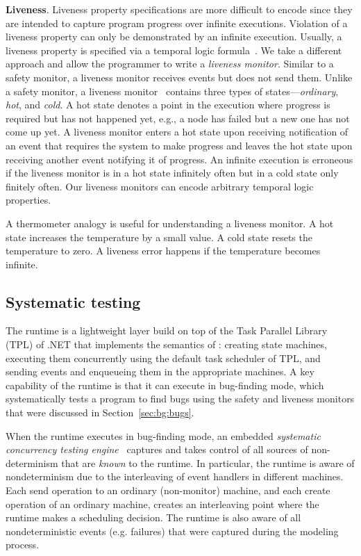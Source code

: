 \textbf{Liveness}.
Liveness property specifications are more difficult to encode since they are intended to capture program progress
over infinite executions.
Violation of a liveness property can only be demonstrated by an infinite execution.
Usually, a liveness property is specified via a temporal logic formula~\cite{Pnueli1977,lamport1994temporal}.
We take a different approach and allow the programmer to write a \emph{liveness monitor}.
Similar to a safety monitor, a liveness monitor receives events but does not send them.
Unlike a safety monitor, a liveness monitor~\cite{desai2015building}
contains three types of states---\emph{ordinary}, \emph{hot}, and \emph{cold}.
A hot state denotes a point in the execution where progress is required but has not happened yet,
e.g., a node has failed but a new one has not come up yet.
A liveness monitor enters a hot state upon receiving notification of an event that requires the system
to make progress and leaves the hot state upon receiving another event notifying it of progress.
An infinite execution is erroneous if the liveness monitor is in a hot state infinitely often but in a cold state only finitely often.
Our liveness monitors can encode arbitrary temporal logic properties.

A thermometer analogy is useful for understanding a liveness monitor.
A hot state increases the temperature by a small value.
A cold state resets the temperature to zero.
A liveness error happens if the temperature becomes infinite.

\subsection{Systematic testing}
\label{sec:psharp:testing}

The \psharp runtime is a lightweight layer build on top of the Task Parallel Library (TPL) of .NET that implements the semantics of \psharp: creating state machines, executing them concurrently using the default task scheduler of TPL, and sending events and enqueueing them in the appropriate machines. A key capability of the \psharp runtime is that it can execute in bug-finding mode, which systematically tests a \psharp program to find bugs using the safety and liveness monitors that were discussed in Section~\ref{sec:bg:bugs}.

When the \psharp runtime executes in bug-finding mode, an embedded \emph{systematic concurrency testing engine}~\cite{godefroid1997verisoft, musuvathi2008finding, emmi2011delay} captures and takes control of all sources of non-determinism that are \emph{known} to the \psharp runtime. In particular, the runtime is aware of nondeterminism due to the interleaving of event handlers in different machines. Each send operation to an ordinary (non-monitor) machine, and each create operation of an ordinary machine, creates an interleaving point where the runtime makes a scheduling decision. The runtime is also aware of all nondeterministic events (e.g. failures) that were captured during the modeling process.

